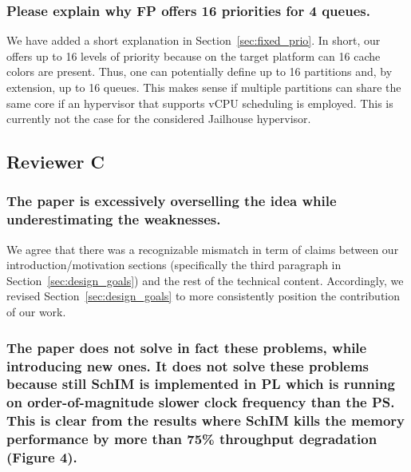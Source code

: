         \subsubsection{Please explain why FP offers 16 priorities for
        4 queues.}

        We have added a short explanation in
        Section~\ref{sec:fixed_prio}. In short, our \schim offers up
        to 16 levels of priority because on the target platform can 16
        cache colors are present. Thus, one can potentially define up
        to 16 partitions and, by extension, up to 16 queues. This
        makes sense if multiple partitions can share the same core if
        an hypervisor that supports vCPU scheduling is employed. This
        is currently not the case for the considered Jailhouse
        hypervisor.

    \subsection{Reviewer C}

        \subsubsection{The paper is excessively overselling the idea
        while underestimating the weaknesses.}

        We agree that there was a recognizable mismatch in term of
        claims between our introduction/motivation sections
        (specifically the third paragraph in
        Section~\ref{sec:design_goals}) and the rest of the technical
        content. Accordingly, we revised
        Section~\ref{sec:design_goals} to more consistently position
        the contribution of our work.

        \subsubsection{The paper does not solve in fact these
        problems, while introducing new ones. It does not solve these
        problems because still SchIM is implemented in PL which is
        running on order-of-magnitude slower clock frequency than the
        PS. This is clear from the results where SchIM kills the
        memory performance by more than 75\% throughput degradation
        (Figure 4).}

